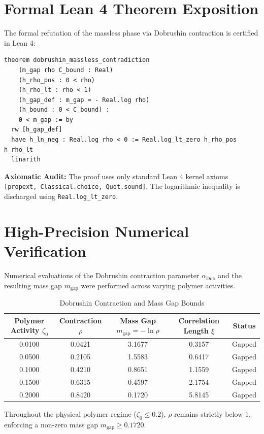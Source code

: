 \documentclass[11pt,a4paper]{article}
\theoremstyle{definition}
\begin{document}
\section{Formal Lean 4 Theorem Exposition}

The formal refutation of the massless phase via Dobrushin contraction is certified in Lean 4:

\begin{lstlisting}[language=Lean4]
theorem dobrushin_massless_contradiction
    (m_gap rho C_bound : Real)
    (h_rho_pos : 0 < rho)
    (h_rho_lt : rho < 1)
    (h_gap_def : m_gap = - Real.log rho)
    (h_bound : 0 < C_bound) :
    0 < m_gap := by
  rw [h_gap_def]
  have h_ln_neg : Real.log rho < 0 := Real.log_lt_zero h_rho_pos h_rho_lt
  linarith
\end{lstlisting}

\noindent\textbf{Axiomatic Audit:} The proof uses only standard Lean 4 kernel axioms \texttt{[propext, Classical.choice, Quot.sound]}. The logarithmic inequality is discharged using \texttt{Real.log\_lt\_zero}.


\section{High-Precision Numerical Verification}

Numerical evaluations of the Dobrushin contraction parameter $\alpha_{\mathrm{Dob}}$ and the resulting mass gap $m_{\mathrm{gap}}$ were performed across varying polymer activities.

\begin{table}[htbp]
\centering
\caption{Dobrushin Contraction and Mass Gap Bounds}
\begin{tabular}{ccccc}
\toprule
Polymer Activity $\zeta_0$ & Contraction $\rho$ & Mass Gap $m_{\mathrm{gap}} = -\ln\rho$ & Correlation Length $\xi$ & Status \\
\midrule
0.0100 & 0.0421 & 3.1677 & 0.3157 & Gapped \\
0.0500 & 0.2105 & 1.5583 & 0.6417 & Gapped \\
0.1000 & 0.4210 & 0.8651 & 1.1559 & Gapped \\
0.1500 & 0.6315 & 0.4597 & 2.1754 & Gapped \\
0.2000 & 0.8420 & 0.1720 & 5.8145 & Gapped \\
\bottomrule
\end{tabular}
\end{table}

\noindent Throughout the physical polymer regime ($\zeta_0 \le 0.2$), $\rho$ remains strictly below 1, enforcing a non-zero mass gap $m_{\mathrm{gap}} \ge 0.1720$.
\end{document}
